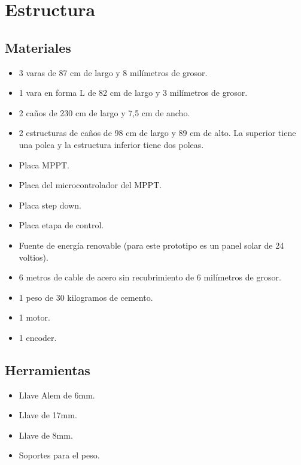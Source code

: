 \chapter{Estructura}
    \section{Materiales}
        \begin{itemize} [label=•]
        \setlength{\itemindent}{3em}
            \item 3 varas de 87 cm de largo y 8 milímetros de grosor.
            \item 1 vara en forma L de 82 cm de largo y 3 milímetros de grosor.
            \item 2 caños de 230 cm de largo y 7,5 cm de ancho. 
            \item 2 estructuras de caños de 98 cm de largo y 89 cm de alto. La superior tiene una polea y la estructura inferior tiene dos poleas.
            \item Placa MPPT.
            \item Placa del microcontrolador del MPPT.
            \item Placa step down.
            \item Placa etapa de control.
            \item Fuente de energía renovable (para este prototipo es un panel solar de 24 voltios).
            \item 6 metros de cable de acero sin recubrimiento de 6 milímetros de grosor.
            \item 1 peso de 30 kilogramos de cemento.
            \item 1 motor.
            \item 1 encoder.
        \end{itemize}
        
    \section{Herramientas}
        \begin{itemize} [label=•]
        \setlength{\itemindent}{3em}
            \item Llave Alem de 6mm.
            \item Llave de 17mm.
            \item Llave de 8mm.
            \item Soportes para el peso.
        \end{itemize}

